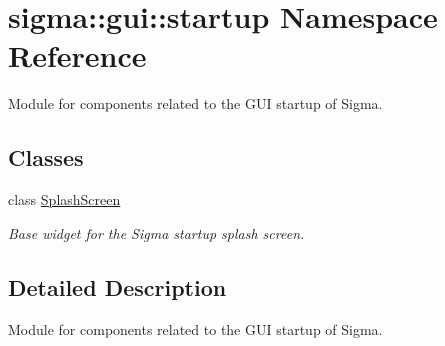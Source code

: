 \hypertarget{namespacesigma_1_1gui_1_1startup}{}\section{sigma\+:\+:gui\+:\+:startup Namespace Reference}
\label{namespacesigma_1_1gui_1_1startup}


Module for components related to the G\+U\+I startup of Sigma.  


\subsection*{Classes}
\begin{DoxyCompactItemize}
\item 
class \hyperlink{classsigma_1_1gui_1_1startup_1_1_splash_screen}{Splash\+Screen}
\begin{DoxyCompactList}\small\item\em Base widget for the Sigma startup splash screen. \end{DoxyCompactList}\end{DoxyCompactItemize}


\subsection{Detailed Description}
Module for components related to the G\+U\+I startup of Sigma. 